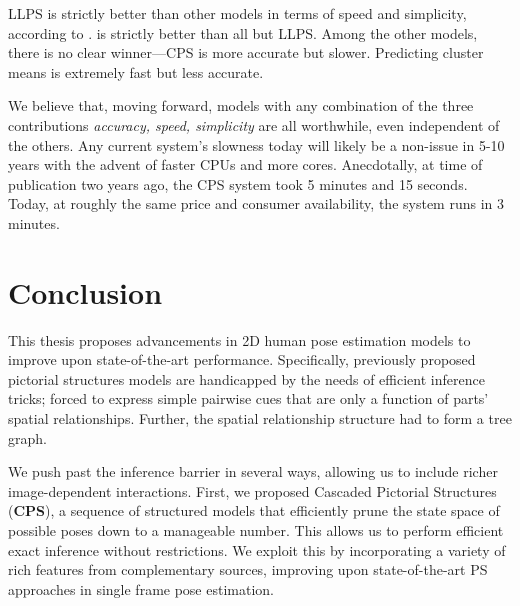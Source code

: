 LLPS is strictly better than other models in terms of speed and simplicity, 
according to . \citet{deva2011} is strictly better than all 
but LLPS.  Among the other models, there is no clear winner---CPS is more 
accurate but slower.  Predicting cluster means is extremely fast but less 
accurate.

We believe that, moving forward, models with any combination of the three 
contributions {\em accuracy, speed, simplicity} are all worthwhile, even 
independent of the others. Any current system's slowness today will likely be a 
non-issue in 5-10 years with the advent of faster CPUs and more cores.  
Anecdotally, at time of publication two years ago, the CPS system took 5 
minutes and 15 seconds.  Today, at roughly the same price and consumer 
availability, the system runs in 3 minutes.


\chapter{Conclusion}

This thesis proposes advancements in 2D human pose estimation models to improve 
upon state-of-the-art performance.  Specifically, previously proposed pictorial 
structures models are handicapped by the needs of efficient inference tricks; 
forced to express simple pairwise cues that are only a function of parts' 
spatial relationships.  Further, the spatial relationship structure had to form 
a tree graph.

We push past the inference barrier in several ways, allowing us to include 
richer image-dependent interactions.  First, we proposed Cascaded Pictorial 
Structures ({\bf CPS}), a sequence of structured models that efficiently prune 
the state space of possible poses down to a manageable number.  This allows us 
to perform efficient exact inference without restrictions.  We exploit this by 
incorporating a variety of rich features from complementary sources, improving 
upon state-of-the-art PS approaches in single frame pose estimation.

